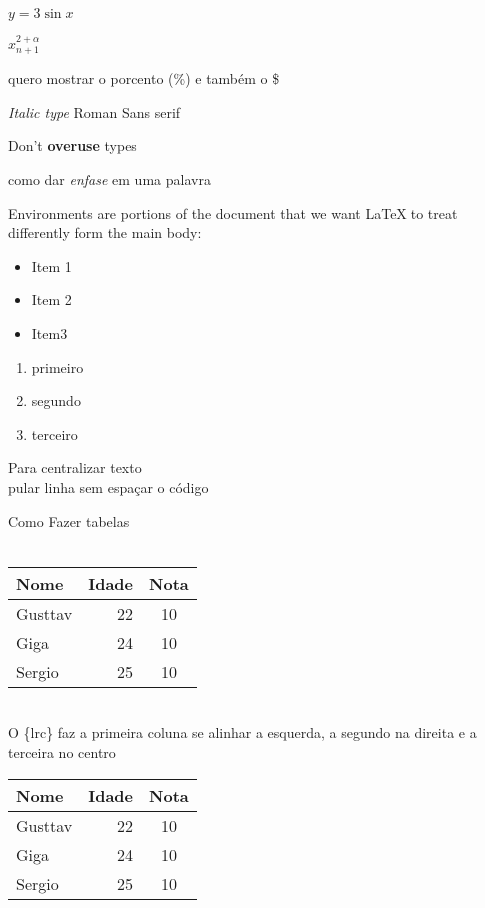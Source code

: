 \documentclass{article}
\begin{document}
\noindent $y=3\sin x$

$x^{2+\alpha}_{n+1}$


quero mostrar o porcento (\%) e também o \$

\textit{Italic type}
\textrm{Roman}
\textsf{Sans serif}

\textup{Don't \textbf{overuse} types}

como dar \emph{enfase} em uma palavra 

Environments are portions of the document that we want \LaTeX $\;$to treat differently form the main body:

\begin{itemize}
	\item Item 1
	\item Item 2
	\item Item3

\end{itemize}

\begin{enumerate}
	\item primeiro
	\item segundo
	\item terceiro

\end{enumerate}

\begin{center}
Para centralizar texto\\
pular linha sem espaçar o código
\end{center}

Como Fazer tabelas\\
\\
\begin{tabular}{lrc}
Nome & Idade & Nota\\
\hline
Gusttav & 22 & 10\\
Giga & 24 & 10\\
Sergio & 25 & 10
\end{tabular}
\\
O \{lrc\} faz a primeira coluna se alinhar a esquerda, a segundo na direita e a terceira no centro

\begin{center}
\begin{tabular}{|l| |r|c|}
\hline
Nome & Idade & Nota\\
\hline
Gusttav & 22 & 10\\
Giga & 24 & 10\\
Sergio & 25 & 10\\
\hline

\end{tabular}
\end{center}
\end{document}
